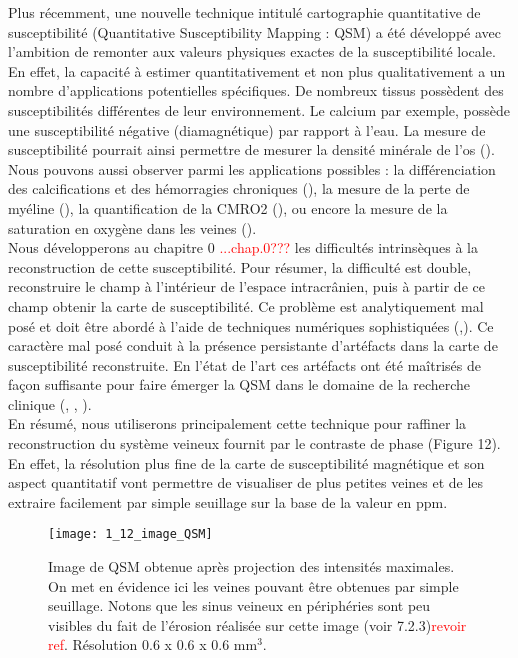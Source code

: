 Plus récemment, une nouvelle technique intitulé cartographie quantitative de susceptibilité (Quantitative Susceptibility Mapping : QSM) a été développé avec l’ambition de remonter aux valeurs physiques exactes de la susceptibilité locale. En effet, la capacité à estimer quantitativement et non plus qualitativement a un nombre d’applications potentielles spécifiques. De nombreux tissus possèdent des susceptibilités différentes de leur environnement. Le calcium par exemple, possède une susceptibilité négative (diamagnétique) par rapport à l’eau. La mesure de susceptibilité pourrait ainsi permettre de mesurer la densité minérale de l’os (\cite{Chung1996}). Nous pouvons aussi observer parmi les applications possibles : la différenciation des calcifications et des hémorragies chroniques (\cite{Kozic2009}), la mesure de la perte de myéline (\cite{Liu2011}), la quantification de la CMRO2 (\cite{Zhang2014}), ou encore la mesure de la saturation en oxygène dans les veines (\cite{Fan2014}).\\
Nous développerons au chapitre 0 \textcolor{red}{...chap.0???} les difficultés intrinsèques à la reconstruction de cette susceptibilité. Pour résumer, la difficulté est double, reconstruire le champ à l’intérieur de l’espace intracrânien, puis à partir de ce champ obtenir la carte de susceptibilité. Ce problème est analytiquement mal posé et doit être abordé à l’aide de techniques numériques sophistiquées (\cite{Haacke2005},\cite{Shmueli2009}). Ce caractère mal posé conduit à la présence persistante d’artéfacts dans la carte de susceptibilité reconstruite. En l’état de l’art ces artéfacts ont été maîtrisés de façon suffisante pour faire émerger la QSM dans le domaine de la recherche clinique (\cite{Wang_Liu_2014}, \cite{Bilgic2013}, \cite{Deistung2013}).\\
En résumé, nous utiliserons principalement cette technique pour raffiner la reconstruction du système veineux fournit par le contraste de phase (Figure 12). En effet, la résolution plus fine de la carte de susceptibilité magnétique et son aspect quantitatif vont permettre de visualiser de plus petites veines et de les extraire facilement par simple seuillage sur la base de la valeur en ppm.
\begin{figure}[!t]
\centering
\texttt{[image: 1\_12\_image\_QSM]}
\caption{Image de QSM obtenue après projection des intensités maximales. On met en évidence ici les veines pouvant être obtenues par simple seuillage. Notons que les sinus veineux en périphéries sont peu visibles du fait de l’érosion réalisée sur cette image (voir 7.2.3)\textcolor{red}{revoir ref}. Résolution 0.6 x 0.6 x 0.6 mm$^3$.}
\label{fig:1_12_image_QSM}	
\end{figure}

